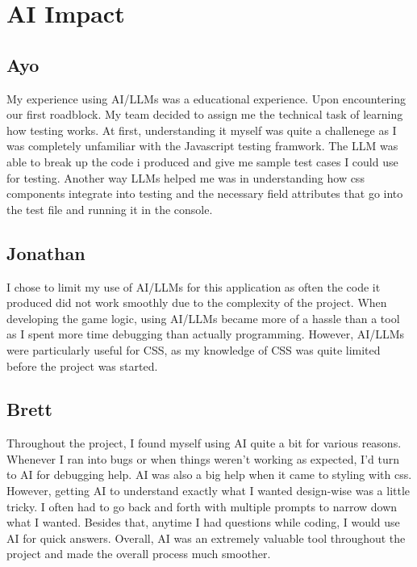 \section{AI Impact}

\subsection{Ayo}
My experience using AI/LLMs was a educational experience. Upon encountering our first roadblock. My team decided to assign me the technical task of learning how testing works. At first, understanding it myself was quite a challenege as I was completely unfamiliar with the Javascript testing framwork. The LLM was able to break up the code i produced and give me sample test cases I could use for testing. Another way LLMs helped me was in understanding how css components integrate into testing and the necessary field attributes that go into the test file and running it in the console.

\subsection{Jonathan}
I chose to limit my use of AI/LLMs for this application as often the code it produced did not work smoothly due to the complexity of the project. When developing the game logic, using AI/LLMs became more of a hassle than a tool as I spent more time debugging than actually programming. However, AI/LLMs were particularly useful for CSS, as my knowledge of CSS was quite limited before the project was started. 

\subsection{Brett}
Throughout the project, I found myself using AI quite a bit for various reasons. Whenever I ran into bugs or when things weren’t working as expected, I’d turn to AI for debugging help. AI was also a big help when it came to styling with css. However, getting AI to understand exactly what I wanted design-wise was a little tricky. I often had to go back and forth with multiple prompts to narrow down what I wanted. Besides that, anytime I had questions while coding, I would use AI for quick answers. Overall, AI was an extremely valuable tool throughout the project and made the overall process much smoother.